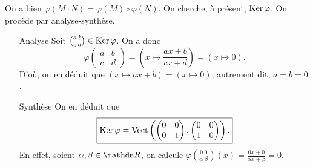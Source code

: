 \documentclass[a4paper]{article}
\begin{document}
\begin{enumerate}
\[		\] On a bien $\varphi(M\cdot N) = \varphi(M)  \circ \varphi(N)$.
		On cherche, à présent, $\operatorname{Ker} \varphi$. On procède par analyse-synthèse.
		\begin{itemize}
			\item[{\sc Analyse}] Soit ${a\:b\choose c\:d} \in \operatorname{Ker} \varphi$. On a donc \[
					\varphi \begin{pmatrix}
						a&b\\
						c&d
					\end{pmatrix} = \left(x \mapsto \frac{ax + b}{cx + d}\right) = (x\mapsto 0)
				.\] D'où, on en déduit que $(x \mapsto ax + b) = (x\mapsto 0)$, autrement dit, $a = b= 0$.
			\item[{\sc Synthèse}] On en déduit que \[
				\boxed{\operatorname{Ker} \varphi = \operatorname{Vect}\left( \begin{pmatrix} 0&0\\0&1\\\end{pmatrix}, \begin{pmatrix} 0&0\\1&0\\\end{pmatrix} \right).}
			\] En effet, soient $\alpha, \beta \in \R$, on calcule $\varphi{0\:0\choose \alpha\:\beta}(x) = \frac{0x + 0}{\alpha x + \beta} = 0$.
		\end{itemize}
	\end{enumerate}
	\bigskip
	\bigskip
\end{document}
